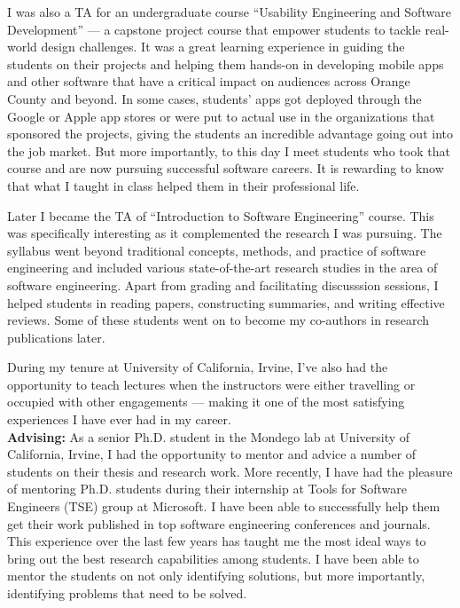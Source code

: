 \documentclass[a4paper]{article}
\begin{document}
I was also a TA for an undergraduate course \enquote{Usability Engineering and Software Development} --- a capstone project course that empower students to tackle real-world design challenges.
It was a great learning experience in guiding the students on their projects and helping them hands-on in developing mobile apps and other software that have a critical impact on audiences across Orange County and beyond. 
In some cases, students’ apps got deployed through the Google or Apple app stores or were put to actual use in the organizations that sponsored the projects, giving the students an incredible advantage going out into the job market.
But more importantly, to this day I meet students who took that course and are now pursuing successful software careers. It is rewarding to know that what I taught in class helped them in their professional life. 

Later I became the TA of \enquote{Introduction to Software Engineering} course. This was specifically interesting as it complemented the research I was pursuing. The syllabus went beyond traditional concepts, methods, and  practice of software engineering and included various state-of-the-art research studies in the area of software engineering. Apart from grading and facilitating discusssion sessions, I helped students in reading papers, constructing summaries, and writing effective reviews.  Some of these students went on to become my co-authors in research publications later. 

During my tenure at University of California, Irvine, I've also had the opportunity to teach lectures when the instructors were either travelling or occupied with other engagements --- making it one of the most satisfying experiences I have ever had in my career. \\

\noindent \textbf{Advising:} As a senior Ph.D. student in the Mondego lab at University of California, Irvine, I had
the opportunity to mentor and advice a number of students on their thesis and research work.
More recently, I have had the pleasure of mentoring Ph.D. students during their internship at Tools for Software Engineers (TSE) group at Microsoft.
I have been able to successfully help them get their work published in top software engineering conferences and journals. 
This experience over the last few years has taught me the most ideal ways to bring out the best research capabilities among students. I have
been able to mentor the students on not only identifying solutions, but more importantly, identifying problems that need to be solved.
\end{document}
